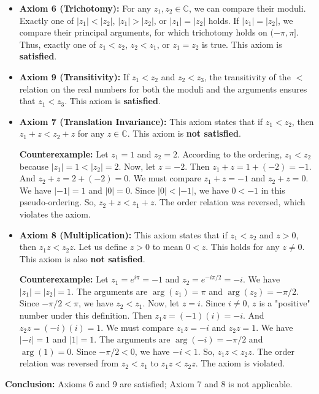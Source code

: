 \begin{itemize}
    \item \textbf{Axiom 6 (Trichotomy):} For any $z_1, z_2 \in \mathbb{C}$, we can compare their moduli. Exactly one of $|z_1| < |z_2|$, $|z_1| > |z_2|$, or $|z_1| = |z_2|$ holds. If $|z_1| = |z_2|$, we compare their principal arguments, for which trichotomy holds on $(-\pi, \pi]$. Thus, exactly one of $z_1 < z_2$, $z_2 < z_1$, or $z_1 = z_2$ is true. This axiom is \textbf{satisfied}.

    \item \textbf{Axiom 9 (Transitivity):} If $z_1 < z_2$ and $z_2 < z_3$, the transitivity of the $<$ relation on the real numbers for both the moduli and the arguments ensures that $z_1 < z_3$. This axiom is \textbf{satisfied}.

    \item \textbf{Axiom 7 (Translation Invariance):} This axiom states that if $z_1 < z_2$, then $z_1 + z < z_2 + z$ for any $z \in \mathbb{C}$. This axiom is \textbf{not satisfied}.
    
    \textbf{Counterexample:} Let $z_1 = 1$ and $z_2 = 2$. According to the ordering, $z_1 < z_2$ because $|z_1|=1 < |z_2|=2$.
    Now, let $z = -2$.
    Then $z_1 + z = 1 + (-2) = -1$.
    And $z_2 + z = 2 + (-2) = 0$.
    We must compare $z_1+z = -1$ and $z_2+z=0$.
    We have $|-1|=1$ and $|0|=0$. Since $|0| < |-1|$, we have $0 < -1$ in this pseudo-ordering.
    So, $z_2 + z < z_1 + z$. The order relation was reversed, which violates the axiom.

    \item \textbf{Axiom 8 (Multiplication):} This axiom states that if $z_1 < z_2$ and $z > 0$, then $z_1 z < z_2 z$. Let us define $z>0$ to mean $0<z$. This holds for any $z \neq 0$. This axiom is also \textbf{not satisfied}.
    
    \textbf{Counterexample:} Let $z_1 = e^{i\pi} = -1$ and $z_2 = e^{-i\pi/2} = -i$.
    We have $|z_1| = |z_2| = 1$. The arguments are $\arg(z_1) = \pi$ and $\arg(z_2) = -\pi/2$. Since $-\pi/2 < \pi$, we have $z_2 < z_1$.
    Now, let $z = i$. Since $i \neq 0$, $z$ is a "positive" number under this definition.
    Then $z_1 z = (-1)(i) = -i$.
    And $z_2 z = (-i)(i) = 1$.
    We must compare $z_1 z = -i$ and $z_2 z = 1$.
    We have $|-i|=1$ and $|1|=1$. The arguments are $\arg(-i) = -\pi/2$ and $\arg(1) = 0$. Since $-\pi/2 < 0$, we have $-i < 1$.
    So, $z_1 z < z_2 z$. The order relation was reversed from $z_2 < z_1$ to $z_1 z < z_2 z$. The axiom is violated.
\end{itemize}
\textbf{Conclusion:} Axioms 6 and 9 are satisfied; Axiom 7 and 8 is not applicable.

